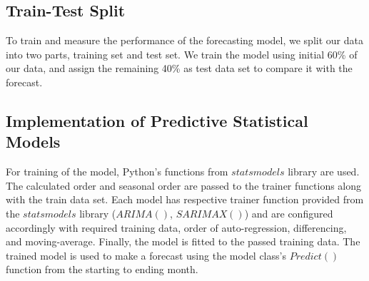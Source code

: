 \documentclass[]{usiinfbachelorproject}
\begin{document}
\subsection{Train-Test Split}
To train and measure the performance of the forecasting model, we split our data into two parts, training set and test set. We train the model using initial 60\% of our data, and assign the remaining 40\% as test data set to compare it with the forecast. \\


\subsection{Implementation of Predictive Statistical Models}

For training of the model, Python's functions from ${statsmodels}$ library are used. The calculated order and seasonal order are passed to the trainer functions along with the train data set. Each model has respective trainer function provided from the ${statsmodels}$ library ($ARIMA()$, $SARIMAX()$) and are configured accordingly with required training data, order of auto-regression, differencing, and moving-average. Finally, the model is fitted to the passed training data. 
The trained model is used to make a forecast using the model class's ${Predict()}$ function from the starting to ending month.\\
\end{document}
